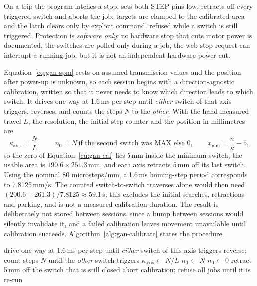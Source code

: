 On a trip the program latches a stop, sets both STEP pins low, retracts off every triggered switch and aborts the job; targets are clamped to the calibrated area and the latch clears only by explicit command, refused while a switch is still triggered. Protection is \emph{software only}: no hardware stop that cuts motor power is documented, the switches are polled only during a job, the web stop request can interrupt a running job, but it is not an independent hardware power cut.

\label{sec:gan-calib}
Equation~\ref{eq:gan-spm} rests on assumed transmission values and the position after power-up is unknown, so each session begins with a direction-agnostic calibration, written so that it never needs to know which direction leads to which switch. It drives one way at 1.6\,ms per step until \emph{either} switch of that axis triggers, reverses, and counts the steps $N$ to the \emph{other}. With the hand-measured travel $L$, the resolution, the initial step counter and the position in millimetres are
\begin{equation}
\kappa_{\mathrm{axis}}=\frac{N}{L},\qquad n_0=N\ \text{if the second switch was MAX else }0,\qquad x_{\mathrm{mm}}=\frac{n}{\kappa}-5,
\label{eq:gan-cal}\label{eq:des-calibration}
\end{equation}
so the zero of Equation~\ref{eq:gan-cal} lies 5\,mm inside the minimum switch, the usable area is $190.6\times251.3$\,mm, and each axis retracts 5\,mm off its last switch. Using the nominal 80 microsteps/mm, a 1.6\,ms homing-step period corresponds to 7.8125\,mm/s. The counted switch-to-switch traverses alone would then need $(200.6+261.3)/7.8125\approx59.1$\,s; this excludes the initial searches, retractions and parking, and is not a measured calibration duration. The result is deliberately not stored between sessions, since a bump between sessions would silently invalidate it, and a failed calibration leaves movement unavailable until calibration succeeds. Algorithm~\ref{alg:gan-calibrate} states the procedure.

\begin{algorithm}[!htbp]
\caption{Direction-agnostic calibration of one axis}
\label{alg:gan-calibrate}
\begin{algorithmic}[1]
\STATE drive one way at 1.6\,ms per step until \emph{either} switch of this axis triggers
\STATE reverse; count steps $N$ until the \emph{other} switch triggers
\STATE $\kappa_{\mathrm{axis}}\leftarrow N/L$ 
    \STATE $n_0\leftarrow N$
\ELSE
    \STATE $n_0\leftarrow0$
\ENDIF
\STATE retract 5\,mm off the switch that is still closed
    \STATE abort calibration; refuse all jobs until it is re-run
\ENDIF
\end{algorithmic}
\end{algorithm}

